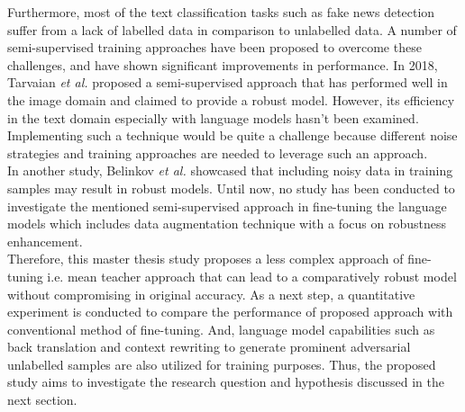 \documentclass[%
	BCOR=8mm, %
	DIV=12,
	toc=bibliography, %
	toc=listof, %
	oneside, %
	egregdoesnotlikesansseriftitles, %
	]{scrbook}
\begin{document}
Furthermore, most of the text classification tasks such as fake news detection suffer from a lack of labelled data in comparison to unlabelled data. A number of semi-supervised training approaches have been proposed to overcome these challenges, and  have shown significant improvements in performance. In 2018, Tarvaian \textit{et al.} \cite{tarvainen_mean_2018} proposed a semi-supervised approach that has performed well in the image domain and  claimed to provide a robust model. However, its efficiency in the text domain especially with language models hasn't been examined. Implementing such a technique would be quite a challenge because different noise strategies and training approaches are needed to leverage such an approach.\\
In another study, Belinkov \textit{et al.} \cite{belinkov_synthetic_2018} showcased that including noisy data in training samples may result in robust models.  Until now, no study has been conducted to investigate the mentioned semi-supervised approach in fine-tuning the language models which includes data augmentation technique with a focus on robustness enhancement. \\
Therefore, this master thesis study proposes a less complex approach of fine-tuning i.e. mean teacher approach that can lead to a comparatively robust model without compromising in original accuracy. As a next step, a quantitative experiment is conducted to compare the performance of proposed approach with conventional method of fine-tuning. And, language model capabilities such as back translation and context rewriting to generate prominent adversarial unlabelled samples are also utilized for training purposes. Thus, the proposed study aims to investigate the research question and hypothesis discussed in the next section.
\end{document}
